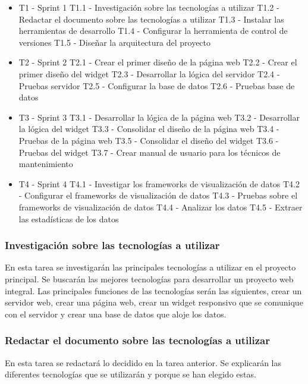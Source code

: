 \begin{itemize}
	\item T1 - Sprint 1
		\subitem T1.1 - Investigación sobre las tecnologías a utilizar
		\subitem T1.2 - Redactar el documento sobre las tecnologías a utilizar
		\subitem T1.3 - Instalar las herramientas de desarrollo
		\subitem T1.4 - Configurar la herramienta de control de versiones
		\subitem T1.5 - Diseñar la arquitectura del proyecto
	\item T2 - Sprint 2
		\subitem T2.1 - Crear el primer diseño de la página web
		\subitem T2.2 - Crear el primer diseño del widget
		\subitem T2.3 -	Desarrollar la lógica del servidor
		\subitem T2.4 - Pruebas servidor
		\subitem T2.5 - Configurar la base de datos
		\subitem T2.6 - Pruebas base de datos
	\item T3 - Sprint 3
		\subitem T3.1 - Desarrollar la lógica de la página web
		\subitem T3.2 - Desarrollar la lógica del widget
		\subitem T3.3 - Consolidar el diseño de la página web
		\subitem T3.4 - Pruebas de la página web
		\subitem T3.5 - Consolidar el diseño del widget
		\subitem T3.6 - Pruebas del widget
		\subitem T3.7 - Crear manual de usuario para los técnicos de mantenimiento
	\item T4 - Sprint 4
		\subitem T4.1 - Investigar los frameworks de visualización de datos
		\subitem T4.2 - Configurar el frameworks de visualización de datos
		\subitem T4.3 - Pruebas sobre el frameworks de visualización de datos
		\subitem T4.4 - Analizar los datos
		\subitem T4.5 - Extraer las estadísticas de los datos

\end{itemize}


\subsubsection{Investigación sobre las tecnologías a utilizar}
En esta tarea se investigarán las principales tecnologías a utilizar en el proyecto principal. Se buscarán las mejores tecnologías para desarrollar un proyecto web integral. Las principales funciones de las tecnologías serán las siguientes, crear un servidor web, crear una página web, crear un widget responsivo que se comunique con el servidor y crear una base de datos que aloje los datos.

\subsubsection{Redactar el documento sobre las tecnologías a utilizar}
En esta tarea se redactará lo decidido en la tarea anterior. Se explicarán las diferentes tecnologías que se utilizarán y porque se han elegido estas.

